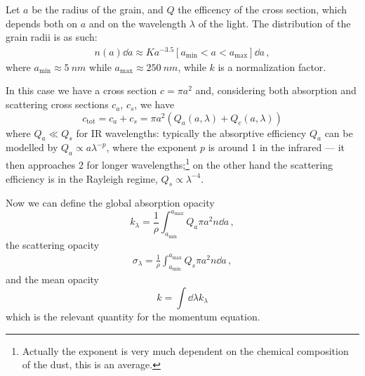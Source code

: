 \documentclass[main.tex]{subfiles}
\begin{document}
Let $a$ be the radius of the grain, and $Q$ the efficency of the cross section, which depends both on \(a\) and on the wavelength \(\lambda \) of the light.
The distribution of the grain radii is as such: 
%
\begin{align}
n(a) \dd{a} \approx K a^{-3.5} [a _{\text{min}} < a < a _{\text{max}} ] \dd{a}
\,,
\end{align}
%
where \(a _{\text{min}} \approx \SI{5}{nm}\) while \(a _{\text{max}} \approx \SI{250}{nm}\), while \(k\) is a normalization factor.


In this case we have a cross section $c=\pi a^2$ and, considering both absorption and scattering cross sections $c_a$, $c_s$, we have
%
\begin{equation}
c_{\text{tot}}
=c_a+c_s
=\pi a^2(Q_a(a,\lambda)+Q_c(a,\lambda))
\end{equation}
%
where $Q_a \ll Q_s$ for IR wavelengths: typically the absorptive efficiency \(Q_a\) can be modelled by \(Q_a \propto a \lambda^{-p}\), where the exponent \(p\) is around 1 in the infrared --- it then approaches 2 for longer wavelengths;\footnote{Actually the exponent is very much dependent on the chemical composition of the dust, this is an average.} on the other hand the scattering efficiency is in the Rayleigh regime, \(Q_s \propto \lambda^{-4}\).

Now we can define the global absorption opacity
%
\begin{equation}
k_\lambda=\frac{1}{\rho } \int_{a_{\text{min}}}^{a_{\text{max}}}Q_a\pi a^2 n \dd{a}
\,,
\end{equation}
%
the scattering opacity 
%
\begin{align}
\sigma_{\lambda } = \frac{1}{\rho } \int_{a_{\text{min}}}^{a_{\text{max}}} Q_s \pi a^2 n \dd{a}
\,,
\end{align}
%
and the mean opacity
%
\begin{equation}
k=\int \dd{\lambda} k_\lambda
\end{equation}
%
which is the relevant quantity for the momentum equation.
\end{document}
